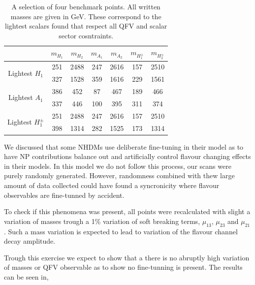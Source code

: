 \documentclass[10pt]{book}
\renewcommand{\(}{\left(}
\renewcommand{\)}{\right)}
\renewcommand{\[}{\left[}
\renewcommand{\]}{\right]}
\begin{document}
%
\begin{table}[H]
\centering
\begin{tabular}{c|c|c|c|c|c|c|}
\cline{2-7} 
                                                          & $m_{H_1}$ & $m_{H_2}$ & $m_{A_1}$ & $m_{A_2}$ & $m_{H^\pm_1}$ & $m_{H^\pm_2}$ \\ \hline
\multicolumn{1}{|c|}{\multirow{2}{*}{Lightest $H_1$}}     & 251 & 2488 & 247 & 2616 & 157 & 2510  \\ \cline{2-7} 
\multicolumn{1}{|c|}{}                                    & 327 & 1528 & 359 & 1616 & 229 & 1561  \\ \hline
\multicolumn{1}{|c|}{\multirow{2}{*}{Lightest $A_1$}}     & 386 & 452  & 87  & 467 & 189  & 466  \\ \cline{2-7} 
\multicolumn{1}{|c|}{}                                    & 337 & 446  & 100 & 395 & 311  & 374  \\ \hline
\multicolumn{1}{|c|}{\multirow{2}{*}{Lightest $H^\pm_1$}} & 251 & 2488 & 247 & 2616 & 157 & 2510 \\ \cline{2-7} 
\multicolumn{1}{|c|}{}                                    & 398 & 1314 & 282 & 1525 & 173 & 1314 \\ \hline
\end{tabular}
\caption{A selection of four benchmark points. All written masses are given in GeV. These correspond to the lightest scalars found that respect all QFV and scalar sector cosntraints.}
\label{Tab:BadTable}
\end{table}

We discussed that some NHDMs use deliberate fine-tuning in their model as to have NP contributions balance out and artificially control flavour changing effects in their models. In this model we do not follow this process, our scans were purely randomly generated.  
%
However, randomness combined with thew large amount of data collected could have found a syncronicity where flavour observables are fine-tunned by accident. 
%

To check if this phenomena was present, all points were recalculated with slight a variation of masses trough a 1\% variation of soft breaking terms, $\mu_{13}$, $\mu_{23}$ and $\mu_{21}$. 
%
Such a mass variation is expected to lead to variation of the flavour channel decay amplitude. 

Trough this exercise we expect to show that a there is no abruptly high variation of masses or QFV observable as to show no fine-tunning is present.
% 
The results can be seen in, 
\end{document}
